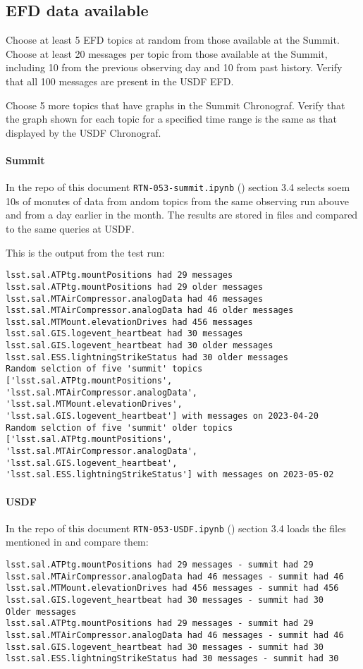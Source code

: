 \subsection{EFD data available }
Choose at least 5 EFD topics at random from those available at the Summit.
Choose at least 20 messages per topic from those available at the Summit, including 10 from the previous observing day and 10 from past history.
Verify that all 100 messages are present in the USDF EFD.

Choose 5 more topics that have graphs in the Summit Chronograf.
Verify that the graph shown for each topic for a specified time range is the same as that displayed by the USDF Chronograf.
\paragraph{Summit} \label{sec:efdsummit}
In the repo of this document \texttt{RTN-053-summit.ipynb} ()  section 3.4
selects soem 10s of monutes of data from andom topics from the same observing run abouve and from a day earlier in the month.
The results are stored in files and compared to the same  queries at USDF.

This is the output from the test run:

\begin{verbatim}
lsst.sal.ATPtg.mountPositions had 29 messages
lsst.sal.ATPtg.mountPositions had 29 older messages
lsst.sal.MTAirCompressor.analogData had 46 messages
lsst.sal.MTAirCompressor.analogData had 46 older messages
lsst.sal.MTMount.elevationDrives had 456 messages
lsst.sal.GIS.logevent_heartbeat had 30 messages
lsst.sal.GIS.logevent_heartbeat had 30 older messages
lsst.sal.ESS.lightningStrikeStatus had 30 older messages
Random selction of five 'summit' topics ['lsst.sal.ATPtg.mountPositions',
'lsst.sal.MTAirCompressor.analogData', 'lsst.sal.MTMount.elevationDrives',
'lsst.sal.GIS.logevent_heartbeat'] with messages on 2023-04-20
Random selction of five 'summit' older topics ['lsst.sal.ATPtg.mountPositions',
'lsst.sal.MTAirCompressor.analogData', 'lsst.sal.GIS.logevent_heartbeat',
'lsst.sal.ESS.lightningStrikeStatus'] with messages on 2023-05-02
\end{verbatim}

\paragraph{USDF}
In the repo of this document \texttt{RTN-053-USDF.ipynb} ()  section 3.4
loads the files mentioned in  and compare them:

\begin{verbatim}
lsst.sal.ATPtg.mountPositions had 29 messages - summit had 29
lsst.sal.MTAirCompressor.analogData had 46 messages - summit had 46
lsst.sal.MTMount.elevationDrives had 456 messages - summit had 456
lsst.sal.GIS.logevent_heartbeat had 30 messages - summit had 30
Older messages
lsst.sal.ATPtg.mountPositions had 29 messages - summit had 29
lsst.sal.MTAirCompressor.analogData had 46 messages - summit had 46
lsst.sal.GIS.logevent_heartbeat had 30 messages - summit had 30
lsst.sal.ESS.lightningStrikeStatus had 30 messages - summit had 30
\end{verbatim}
